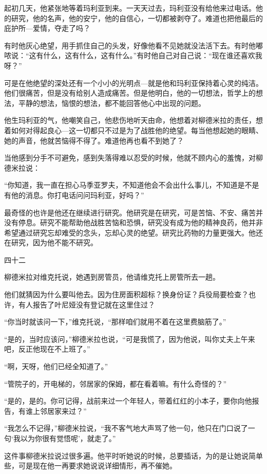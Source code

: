 起初几天，他紧张地等着玛利亚到来。一天天过去，玛利亚没有给他来过电话。他的研究，他的名声，他的安宁，他的自信心，一切都被剥夺了。难道也把他最后的庇护所—爱情，夺走了吗？

有时他灰心绝望，用手抓住自己的头发，好像他看不见她就没法活下去。有时他嘟哝说：“这有什么，这有什么，这有什么。”有时他自己对自己说：“现在谁还喜欢我呀？”

可是在他绝望的深处还有一个小小的光明点—就是他和玛利亚保持着心灵的纯洁。他们很痛苦，但是没有给别人造成痛苦。但是他明白，他的一切想法，哲学上的想法，平静的想法，恼恨的想法，都不能回答他心中出现的问题。

他生玛利亚的气，他嘲笑自己，他悲伤地听天由命，他想着对柳德米拉的责任，想着如何对得起良心—这一切都只不过是为了战胜他的绝望。每当他想起她的眼睛、她的声音，他就苦恼得不得了。难道他再也看不到她了？

当他感到分手不可避免，感到失落得难以忍受的时候，他就不顾内心的羞愧，对柳德米拉说：

“你知道，我一直在担心马季亚罗夫，不知道他会不会出什么事儿，不知道是不是有他的消息。你打电话问问玛利亚，好吗？”

最奇怪的也许是他还在继续进行研究。他研究是在研究，可是苦恼、不安、痛苦并没有停息。研究不能帮助他战胜苦恼和恐惧，研究没有成为他的精神良药，他并非希望通过研究忘却难受的念头，忘却心灵的绝望。研究比药物的力量更强大。他还在研究，因为他不能不研究。

四十二

柳德米拉对维克托说，她遇到房管员，他请维克托上房管所去一趟。

他们就猜因为什么要叫他去。因为住房面积超标？换身份证？兵役局要检查？也许，有人报告了叶尼娅没有登记就在这里住过？

“你当时就该问一下，”维克托说，“那样咱们就用不着在这里费脑筋了。”

“是的，当时应该问，”柳德米拉也说，“可是我慌了，因为他说，叫你丈夫上午来吧，反正他现在不上班了。”

“啊，天呀，他们已经全知道了。”

“管院子的，开电梯的，邻居家的保姆，都在看着嘛。有什么奇怪的？”

“是的，是的。你可记得，战前来过一个年轻人，带着红红的小本子，要你向他报告，有谁上邻居家来过？”

“我怎么不记得，”柳德米拉说，“我不客气地大声骂了他一句，他只在门口说了一句‘我以为你很有觉悟呢’，就走了。”

这件事柳德米拉说过很多遍。他平时听她说的时候，总要插话，为的是让她说简单些，可是现在他一再要求她说说详细情形，再不催她。

